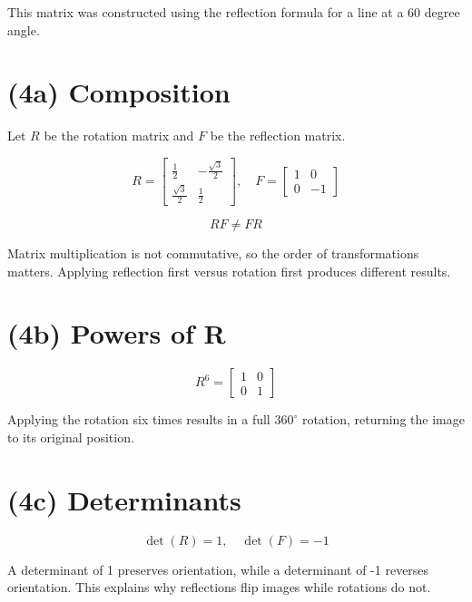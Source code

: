 \documentclass{ximera}
\begin{document}
This matrix was constructed using the reflection formula for a line at a 60 degree angle.

\section*{(4a) Composition}

Let $R$ be the rotation matrix and $F$ be the reflection matrix.

\[
R =
\begin{bmatrix}
\frac{1}{2} & -\frac{\sqrt{3}}{2} \\
\frac{\sqrt{3}}{2} & \frac{1}{2}
\end{bmatrix},
\quad
F =
\begin{bmatrix}
1 & 0 \\
0 & -1
\end{bmatrix}
\]

\[
RF \neq FR
\]

Matrix multiplication is not commutative, so the order of transformations matters. Applying reflection first versus rotation first produces different results.

\section*{(4b) Powers of R}

\[
R^6 =
\begin{bmatrix}
1 & 0 \\
0 & 1
\end{bmatrix}
\]

Applying the rotation six times results in a full $360^\circ$ rotation, returning the image to its original position.

\section*{(4c) Determinants}

\[
\det(R) = 1, \quad \det(F) = -1
\]

A determinant of 1 preserves orientation, while a determinant of -1 reverses orientation. This explains why reflections flip images while rotations do not.
\end{document}
